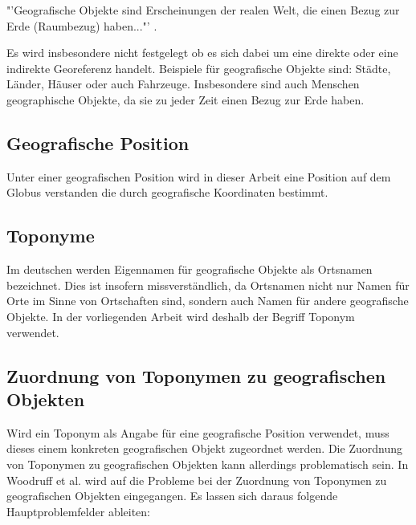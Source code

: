 			"'Geografische Objekte sind Erscheinungen der realen Welt, die einen Bezug zur Erde (Raumbezug) haben..."' \cite{ISO19110:2005}.

			Es wird insbesondere nicht festgelegt ob es sich dabei um eine direkte oder eine indirekte Georeferenz handelt.
			Beispiele für geografische Objekte sind: Städte, Länder, Häuser oder auch Fahrzeuge.
			Insbesondere sind auch Menschen geographische Objekte, da sie zu jeder Zeit einen Bezug zur Erde haben.

		\subsection{Geografische Position}
		
			Unter einer geografischen Position wird in dieser Arbeit eine Position auf dem Globus verstanden die durch geografische Koordinaten bestimmt.

		\subsection{Toponyme}  
			
			Im deutschen werden Eigennamen für geografische Objekte als Ortsnamen bezeichnet. 
			Dies ist insofern missverständlich, da Ortsnamen nicht nur Namen für Orte im Sinne von Ortschaften sind, sondern auch Namen für andere geografische Objekte.
			In der vorliegenden Arbeit wird deshalb der Begriff Toponym verwendet. 

		\subsection{Zuordnung von Toponymen zu geografischen Objekten} \label{sec:zuordnungToponymeGeogObj}

			Wird ein Toponym als Angabe für eine geografische Position verwendet, muss dieses einem konkreten geografischen Objekt zugeordnet werden. 
			Die Zuordnung von Toponymen zu geografischen Objekten kann allerdings problematisch sein.
			In Woodruff et al. \cite{Woodruff1994} wird auf die Probleme bei der Zuordnung von Toponymen zu geografischen Objekten eingegangen.
			Es lassen sich daraus folgende Hauptproblemfelder ableiten:

